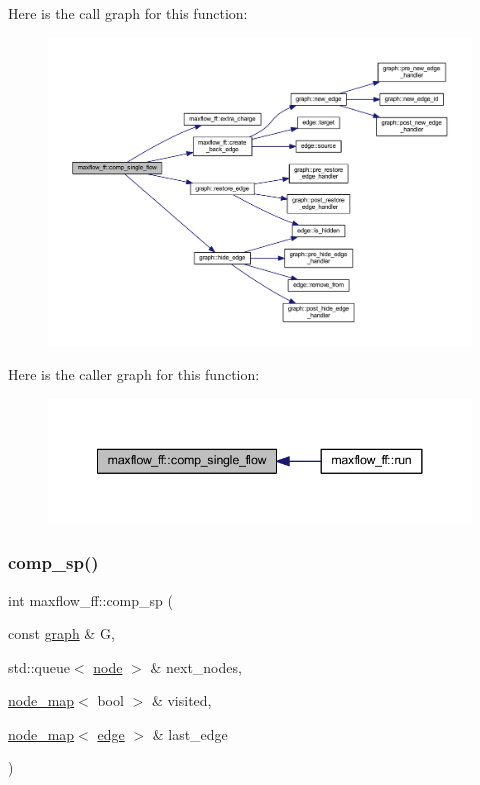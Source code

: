Here is the call graph for this function\+:\nopagebreak
\begin{figure}[H]
\begin{center}
\leavevmode
\includegraphics[width=350pt]{classmaxflow__ff_a22a432bb072e0410f20bb418dfd4d3a9_cgraph}
\end{center}
\end{figure}
Here is the caller graph for this function\+:\nopagebreak
\begin{figure}[H]
\begin{center}
\leavevmode
\includegraphics[width=341pt]{classmaxflow__ff_a22a432bb072e0410f20bb418dfd4d3a9_icgraph}
\end{center}
\end{figure}
\mbox{\label{classmaxflow__ff_afefc972c43e8eb031abaac1451473f9c}} 
\subsubsection{\texorpdfstring{comp\+\_\+sp()}{comp\_sp()}}
{\footnotesize\ttfamily int maxflow\+\_\+ff\+::comp\+\_\+sp (\begin{DoxyParamCaption}\item[{const \mbox{\hyperlink{classgraph}{graph}} \&}]{G,  }\item[{std\+::queue$<$ \mbox{\hyperlink{classnode}{node}} $>$ \&}]{next\+\_\+nodes,  }\item[{\mbox{\hyperlink{classnode__map}{node\+\_\+map}}$<$ bool $>$ \&}]{visited,  }\item[{\mbox{\hyperlink{classnode__map}{node\+\_\+map}}$<$ \mbox{\hyperlink{classedge}{edge}} $>$ \&}]{last\+\_\+edge }\end{DoxyParamCaption})\hspace{0.3cm}{\ttfamily [protected]}}



